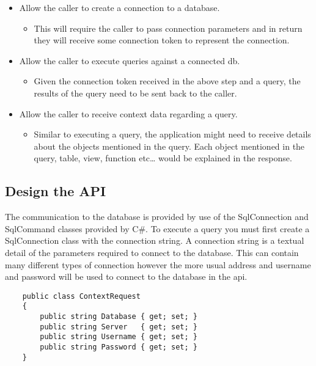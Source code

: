 \begin{itemize}
\tightlist
\item
  Allow the caller to create a connection to a database.

  \begin{itemize}
  \tightlist
  \item
    This will require the caller to pass connection parameters and in
    return they will receive some connection token to represent the
    connection.
  \end{itemize}
\item
  Allow the caller to execute queries against a connected db.

  \begin{itemize}
  \tightlist
  \item
    Given the connection token received in the above step and a query,
    the results of the query need to be sent back to the caller.
  \end{itemize}
\item
  Allow the caller to receive context data regarding a query.

  \begin{itemize}
  \tightlist
  \item
    Similar to executing a query, the application might need to receive
    details about the objects mentioned in the query. Each object
    mentioned in the query, table, view, function etc\ldots{} would be
    explained in the response.
  \end{itemize}
\end{itemize}

\subsection{Design the API}\label{design-the-api}

The communication to the database is provided by use of the
SqlConnection and SqlCommand classes provided by C\#. To execute a query
you must first create a SqlConnection class with the connection string.
A connection string is a textual detail of the parameters required to
connect to the database. This can contain many different types of
connection however the more usual address and username and password will
be used to connect to the database in the api.

\begin{verbatim}
    public class ContextRequest
    {
        public string Database { get; set; }
        public string Server   { get; set; }
        public string Username { get; set; }
        public string Password { get; set; }
    }
\end{verbatim}

